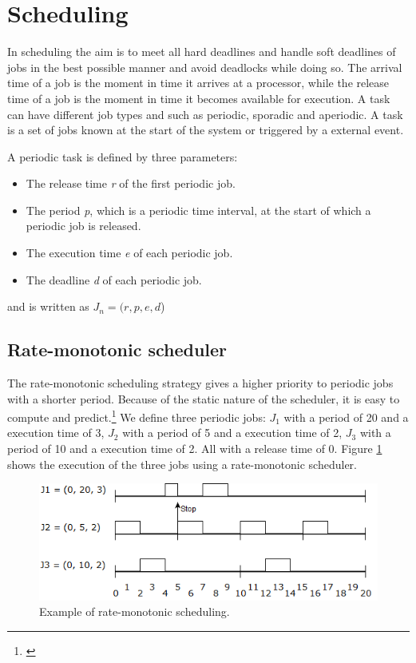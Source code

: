 \section{Scheduling} \label{sc:scheduling}
In scheduling the aim is to meet all hard deadlines and handle soft deadlines of jobs in the best possible manner and avoid deadlocks while doing so. The arrival time of a job is the moment in time it arrives at a processor, while the release time of a job is the moment in time it becomes available for execution. A task can have different job types and such as periodic, sporadic and aperiodic. A task is a set of jobs known at the start of the system or triggered by a external event.

A periodic task is defined by three parameters:
\begin{itemize}
	\itemsep0em
	\item The release time \textit{r} of the first periodic job.
	\item The period \textit{p}, which is a periodic time interval, at the start of which a periodic job is released.
	\item The execution time \textit{e} of each periodic job.
	\item The deadline \textit{d} of each periodic job.
\end{itemize}
and is written as $J_n=(r,p,e,d$)

\subsection{Rate-monotonic scheduler}
The rate-monotonic scheduling strategy gives a higher priority to periodic jobs with a shorter period. Because of the static nature of the scheduler, it is easy to compute and predict.\footnote{\cite[p.~183]{Fokkink1965}}
We define three periodic jobs: $J_1$ with a period of 20 and a execution time of 3, $J_2$ with a period of 5 and a execution time of 2, $J_3$ with a period of 10 and a execution time of 2. All with a release time of 0. Figure \ref{fig:rateMonotonicExample} shows the execution of the three jobs using a rate-monotonic scheduler.

\begin{figure}[!h]
	\centering
	\includegraphics[scale=0.5]{realTimeComputing/fig/rate-mono.png}
	\caption{Example of rate-monotonic scheduling.}
	\label{fig:rateMonotonicExample}
\end{figure}

